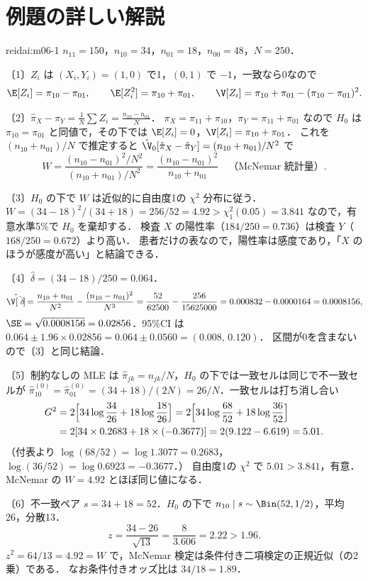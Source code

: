 \section{例題の詳しい解説}\label{sec:m06-kaisetsu}
\begin{kaitou}{reidai:m06-1}
$n_{11}=150$，$n_{10}=34$，$n_{01}=18$，$n_{00}=48$，$N=250$．

〔1〕$Z_i$ は $(X_i,Y_i)=(1,0)$ で1，$(0,1)$ で $-1$，一致なら0なので
\[
\E[Z_i]=\pi_{10}-\pi_{01},\qquad \E[Z_i^2]=\pi_{10}+\pi_{01},\qquad
\V[Z_i]=\pi_{10}+\pi_{01}-(\pi_{10}-\pi_{01})^2 .
\]

〔2〕$\hat\pi_X-\hat\pi_Y=\frac1N\sum Z_i=\frac{n_{10}-n_{01}}{N}$．
$\pi_X=\pi_{11}+\pi_{10}$，$\pi_Y=\pi_{11}+\pi_{01}$ なので $H_0$ は $\pi_{10}=\pi_{01}$ と同値で，その下では $\E[Z_i]=0$，$\V[Z_i]=\pi_{10}+\pi_{01}$．
これを $(n_{10}+n_{01})/N$ で推定すると $\hat\V_0[\hat\pi_X-\hat\pi_Y]=(n_{10}+n_{01})/N^2$ で
\[
W=\frac{(n_{10}-n_{01})^2/N^2}{(n_{10}+n_{01})/N^2}=\frac{(n_{10}-n_{01})^2}{n_{10}+n_{01}}\quad\text{（McNemar 統計量）}.
\]

〔3〕$H_0$ の下で $W$ は近似的に自由度1の $\chi^2$ 分布に従う．
$W=(34-18)^2/(34+18)=256/52=4.92>\chi^2_1(0.05)=3.841$ なので，有意水準5\%で $H_0$ を棄却する．
検査 $X$ の陽性率（$184/250=0.736$）は検査 $Y$（$168/250=0.672$）より高い．
患者だけの表なので，陽性率は感度であり，「$X$ のほうが感度が高い」と結論できる．

〔4〕$\hat\delta=(34-18)/250=0.064$．
\[
\hat\V[\hat\delta]=\frac{n_{10}+n_{01}}{N^2}-\frac{(n_{10}-n_{01})^2}{N^3}=\frac{52}{62500}-\frac{256}{15625000}=0.000832-0.0000164=0.0008156,
\]
$\SE=\sqrt{0.0008156}=0.02856$．95\%CI は $0.064\pm1.96\times0.02856=0.064\pm0.0560=(0.008,\,0.120)$．
区間が0を含まないので〔3〕と同じ結論．

〔5〕制約なしの MLE は $\hat\pi_{jk}=n_{jk}/N$，$H_0$ の下では一致セルは同じで不一致セルが $\hat\pi^{(0)}_{10}=\hat\pi^{(0)}_{01}=(34+18)/(2N)=26/N$．一致セルは打ち消し合い
\begin{align*}
G^2&=2\Bigl[34\log\frac{34}{26}+18\log\frac{18}{26}\Bigr]=2\Bigl[34\log\frac{68}{52}+18\log\frac{36}{52}\Bigr]\\
&=2[34\times0.2683+18\times(-0.3677)]=2(9.122-6.619)=5.01 .
\end{align*}
（付表より $\log(68/52)=\log1.3077=0.2683$，$\log(36/52)=\log0.6923=-0.3677$．）
自由度1の $\chi^2$ で $5.01>3.841$，有意．McNemar の $W=4.92$ とほぼ同じ値になる．

〔6〕不一致ペア $s=34+18=52$．$H_0$ の下で $n_{10}\mid s\sim\Bin(52,1/2)$，平均26，分散13．
\[
z=\frac{34-26}{\sqrt{13}}=\frac{8}{3.606}=2.22>1.96 .
\]
$z^2=64/13=4.92=W$ で，McNemar 検定は条件付き二項検定の正規近似（の2乗）である．
なお条件付きオッズ比は $34/18=1.89$．
\end{kaitou}

